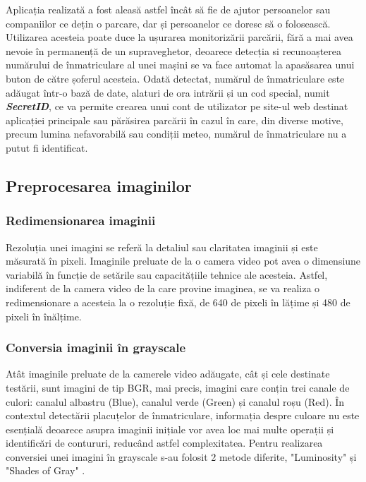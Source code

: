 \documentclass[12pt]{article}
\begin{document}
Aplicația realizat\u{a} a fost aleas\u{a} astfel \^{i}nc\^{a}t s\u{a} fie de ajutor persoanelor sau companiilor ce dețin o parcare, dar și persoanelor ce doresc s\u{a} o foloseasc\u{a}. Utilizarea acesteia poate duce la ușurarea monitoriz\u{a}rii parc\u{a}rii, f\u{a}r\u{a} a mai avea nevoie \^{i}n permanenț\u{a} de un supraveghetor, deoarece detecția si recunoașterea num\u{a}rului de \^{i}nmatriculare al unei mașini se va face automat la apas\u{a}sarea unui buton de c\u{a}tre șoferul acesteia. Odat\u{a} detectat, num\u{a}rul de \^{i}nmatriculare este ad\u{a}ugat \^{i}ntr-o baz\u{a} de date, alaturi de ora intr\u{a}rii și un cod special, numit \textbf{\textit{SecretID}}, ce va permite crearea unui cont de utilizator pe site-ul web destinat aplicației principale sau p\u{a}r\u{a}sirea parc\u{a}rii \^{i}n cazul \^{i}n care, din diverse motive, precum lumina nefavorabil\u{a} sau condiții meteo, num\u{a}rul de \^{i}nmatriculare nu a putut fi identificat. 

\subsection{Preprocesarea imaginilor}


\subsubsection{Redimensionarea imaginii}

Rezoluția unei imagini se refer\u{a} la detaliul sau claritatea imaginii și este m\u{a}surat\u{a} \^{i}n pixeli. Imaginile preluate de la o camera video pot avea o dimensiune variabil\u{a} \^{i}n funcție de set\u{a}rile sau capacit\u{a}țiile tehnice ale acesteia. Astfel, indiferent de la camera video de la care provine imaginea, se va realiza o redimensionare a acesteia la o rezoluție fix\u{a}, de 640 de pixeli \^{i}n l\u{a}țime și 480 de pixeli \^{i}n \^{i}n\u{a}lțime.

\subsubsection{Conversia imaginii \^{i}n grayscale}

At\^{a}t imaginile preluate de la camerele video ad\u{a}ugate, c\^{a}t și cele destinate test\u{a}rii, sunt imagini de tip BGR, mai precis, imagini care conțin trei canale de culori: canalul albastru (Blue), canalul verde (Green)
și canalul roșu (Red). \^{I}n contextul detect\u{a}rii placuțelor de \^{i}nmatriculare, informația despre culoare nu este esențial\u{a} deoarece asupra imaginii inițiale vor avea loc mai multe operații și identific\u{a}ri de contururi, reduc\^{a}nd astfel complexitatea. Pentru realizarea conversiei unei imagini \^{i}n grayscale s-au folosit 2 metode diferite, "Luminosity" și "Shades of Gray" \cite{grayscale}. 
\end{document}
